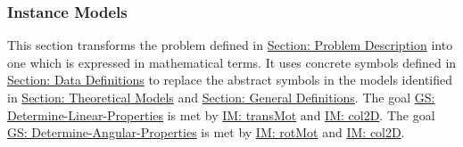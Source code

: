 \documentclass[12pt]{article}
\begin{document}
\subsubsection{Instance Models}
\label{Sec:IMs}
This section transforms the problem defined in \hyperref[Sec:ProbDesc]{Section: Problem Description} into one which is expressed in mathematical terms. It uses concrete symbols defined in \hyperref[Sec:DDs]{Section: Data Definitions} to replace the abstract symbols in the models identified in \hyperref[Sec:TMs]{Section: Theoretical Models} and \hyperref[Sec:GDs]{Section: General Definitions}.
The goal \hyperref[linearGS]{GS: Determine-Linear-Properties} is met by \hyperref[IM:transMot]{IM: transMot} and \hyperref[IM:col2D]{IM: col2D}. The goal \hyperref[angularGS]{GS: Determine-Angular-Properties} is met by \hyperref[IM:rotMot]{IM: rotMot} and \hyperref[IM:col2D]{IM: col2D}.
\par~
\end{document}
